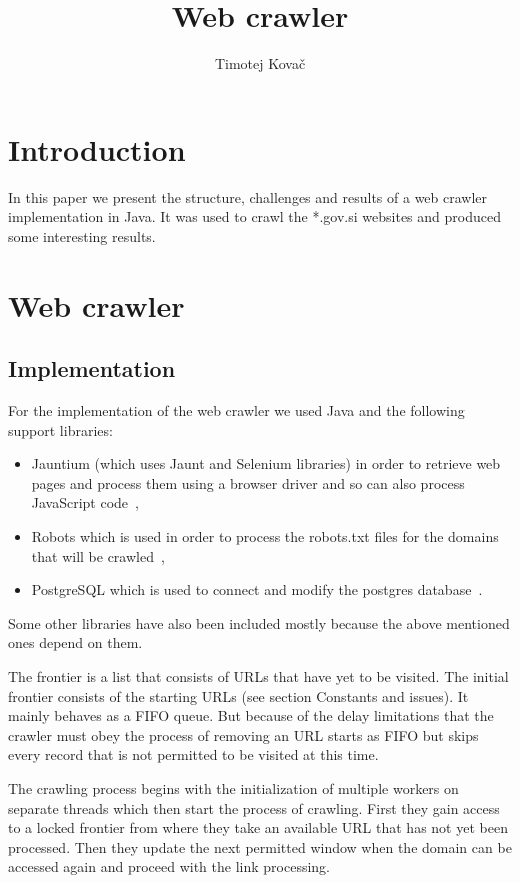 \documentclass[9pt]{IEEEtran}
\title{\vspace{0ex}
Web crawler}
\author{Timotej Kovač\vspace{-4.0ex}}
\begin{document}
\maketitle

\section{Introduction}

In this paper we present the structure, challenges and results of a web crawler implementation in Java.
It was used to crawl the *.gov.si websites and produced some interesting results.

\section{Web crawler}

\subsection{Implementation}

For the implementation of the web crawler we used Java and the following support libraries:
\begin{itemize}
\item{Jauntium (which uses Jaunt and Selenium libraries) in order to retrieve web pages and process them using a browser driver and so can also process JavaScript code~\cite{jauntium},}
\item{Robots which is used in order to process the robots.txt files for the domains that will be crawled~\cite{robots_txt}, }
\item{PostgreSQL which is used to connect and modify the postgres database~\cite{postgres}.}
\end{itemize}

Some other libraries have also been included mostly because the above mentioned ones depend on them.

The frontier is a list that consists of URLs that have yet to be visited.
The initial frontier consists of the starting URLs (see section Constants and issues).
It mainly behaves as a FIFO queue.
But because of the delay limitations that the crawler must obey the process of removing an URL starts as FIFO but skips every record that is not permitted to be visited at this time.

The crawling process begins with the initialization of multiple workers on separate threads which then start the process of crawling.
First they gain access to a locked frontier from where they take an available URL that has not yet been processed.
Then they update the next permitted window when the domain can be accessed again and proceed with the link processing.
\end{document}
